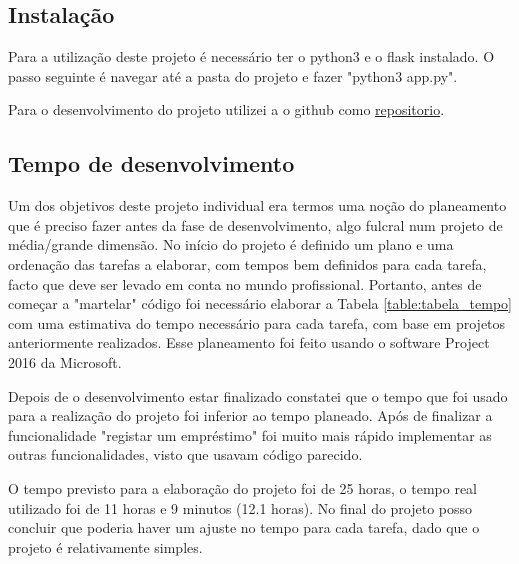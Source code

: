 \documentclass[12pt, a4paper, twoside]{article}
\begin{document}
\subsection{Instalação}

Para a utilização deste projeto é necessário ter o python3 e o flask instalado. O passo seguinte é navegar até a pasta do projeto e fazer "python3 app.py".\\
\par Para o desenvolvimento do projeto utilizei a o github como \href{https://github.com/anunes9/pgp-individual}{repositorio}.

\subsection{Tempo de desenvolvimento}

Um dos objetivos deste projeto individual era termos uma noção do planeamento que é preciso fazer antes da fase de desenvolvimento, algo fulcral num projeto de média/grande dimensão. No início do projeto é definido um plano e uma ordenação das tarefas a elaborar, com tempos bem definidos para cada tarefa, facto que deve ser levado em conta no mundo profissional. Portanto, antes de começar a 
"martelar" código foi necessário elaborar a Tabela \ref{table:tabela_tempo} com uma estimativa do tempo necessário para cada tarefa, com base em projetos anteriormente realizados. Esse planeamento foi feito usando o software Project 2016 da Microsoft. \par Depois de o desenvolvimento estar finalizado constatei que o tempo que foi usado para a realização do projeto foi inferior ao tempo planeado. Após de finalizar a funcionalidade "registar um empréstimo" foi muito mais rápido implementar as outras funcionalidades, visto que usavam código parecido. \par O tempo previsto para a elaboração do projeto foi de 25 horas, o tempo real utilizado foi de 11 horas e 9 minutos (12.1 horas). No final do projeto posso concluir que poderia haver um ajuste no tempo para cada tarefa, dado que o projeto é relativamente simples.

\end{document}
